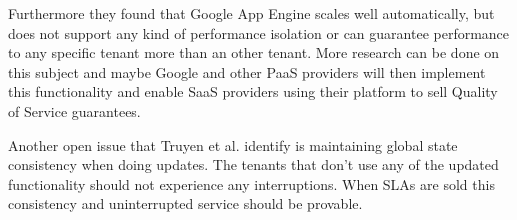 Furthermore they found that Google App Engine scales well automatically, but does not support any kind of performance isolation or can guarantee performance to any specific tenant more than an other tenant. More research can be done on this subject and maybe Google and other PaaS providers will then implement this functionality and enable SaaS providers using their platform to sell Quality of Service guarantees.

Another open issue that Truyen et al. identify is maintaining global state consistency when doing updates. The tenants that don't use any of the updated functionality should not experience any interruptions. When SLAs are sold this consistency and uninterrupted service should be provable.

